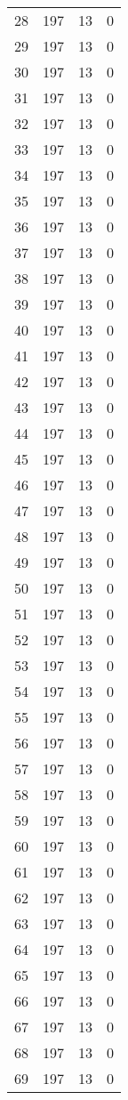 \begin{longtable}[!]{c|ccc}
	28	& 197	& 13	& 0	\\
	29	& 197	& 13	& 0	\\
	30	& 197	& 13	& 0	\\
	31	& 197	& 13	& 0	\\
	32	& 197	& 13	& 0	\\
	33	& 197	& 13	& 0	\\
	34	& 197	& 13	& 0	\\
	35	& 197	& 13	& 0	\\
	36	& 197	& 13	& 0	\\
	37	& 197	& 13	& 0	\\
	38	& 197	& 13	& 0	\\
	39	& 197	& 13	& 0	\\
	40	& 197	& 13	& 0	\\
	41	& 197	& 13	& 0	\\
	42	& 197	& 13	& 0	\\
	43	& 197	& 13	& 0	\\
	44	& 197	& 13	& 0	\\
	45	& 197	& 13	& 0	\\
	46	& 197	& 13	& 0	\\
	47	& 197	& 13	& 0	\\
	48	& 197	& 13	& 0	\\
	49	& 197	& 13	& 0	\\
	50	& 197	& 13	& 0	\\
	51	& 197	& 13	& 0	\\
	52	& 197	& 13	& 0	\\
	53	& 197	& 13	& 0	\\
	54	& 197	& 13	& 0	\\
	55	& 197	& 13	& 0	\\
	56	& 197	& 13	& 0	\\
	57	& 197	& 13	& 0	\\
	58	& 197	& 13	& 0	\\
	59	& 197	& 13	& 0	\\
	60	& 197	& 13	& 0	\\
	61	& 197	& 13	& 0	\\
	62	& 197	& 13	& 0	\\
	63	& 197	& 13	& 0	\\
	64	& 197	& 13	& 0	\\
	65	& 197	& 13	& 0	\\
	66	& 197	& 13	& 0	\\
	67	& 197	& 13	& 0	\\
	68	& 197	& 13	& 0	\\
	69	& 197	& 13	& 0	\\

\end{longtable}
